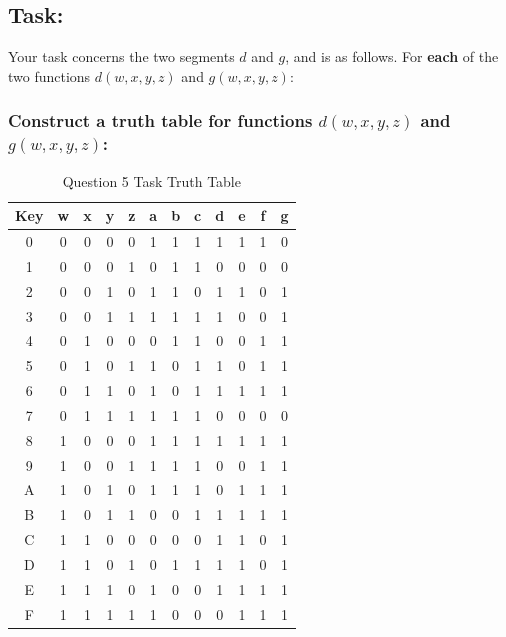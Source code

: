 \documentclass[12pt,a4paper]{article}
\begin{document}
\newpage
\subsection{Task:}
Your task concerns the two segments $d$ and $g$, and is as follows. For \textbf{each} of the two functions $d(w,x,y,z)$ and $g(w,x,y,z)$:

\subsubsection{Construct a truth table for functions $d(w,x,y,z)$ and $g(w,x,y,z)$:}

\begin{table}[h]
\centering
\caption{Question 5 Task Truth Table}
\begin{tabular}{c|c|c|c|c|c|c|c|c|c|c|c}
Key & w & x & y & z & a & b & c & d & e & f & g \\
\hline
0 & 0 & 0 & 0 & 0 & 1 & 1 & 1 & 1 & 1 & 1 & 0 \\
\hline
1 & 0 & 0 & 0 & 1 & 0 & 1 & 1 & 0 & 0 & 0 & 0 \\
\hline
2 & 0 & 0 & 1 & 0 & 1 & 1 & 0 & 1 & 1 & 0 & 1 \\
\hline
3 & 0 & 0 & 1 & 1 & 1 & 1 & 1 & 1 & 0 & 0 & 1 \\
\hline
4 & 0 & 1 & 0 & 0 & 0 & 1 & 1 & 0 & 0 & 1 & 1 \\
\hline
5 & 0 & 1 & 0 & 1 & 1 & 0 & 1 & 1 & 0 & 1 & 1 \\
\hline
6 & 0 & 1 & 1 & 0 & 1 & 0 & 1 & 1 & 1 & 1 & 1 \\
\hline
7 & 0 & 1 & 1 & 1 & 1 & 1 & 1 & 0 & 0 & 0 & 0 \\
\hline
8 & 1 & 0 & 0 & 0 & 1 & 1 & 1 & 1 & 1 & 1 & 1 \\
\hline
9 & 1 & 0 & 0 & 1 & 1 & 1 & 1 & 0 & 0 & 1 & 1 \\
\hline
A & 1 & 0 & 1 & 0 & 1 & 1 & 1 & 0 & 1 & 1 & 1 \\
\hline
B & 1 & 0 & 1 & 1 & 0 & 0 & 1 & 1 & 1 & 1 & 1 \\
\hline
C & 1 & 1 & 0 & 0 & 0 & 0 & 0 & 1 & 1 & 0 & 1 \\
\hline
D & 1 & 1 & 0 & 1 & 0 & 1 & 1 & 1 & 1 & 0 & 1 \\
\hline
E & 1 & 1 & 1 & 0 & 1 & 0 & 0 & 1 & 1 & 1 & 1 \\
\hline
F & 1 & 1 & 1 & 1 & 1 & 0 & 0 & 0 & 1 & 1 & 1 \\
\end{tabular}
\end{table}
\end{document}
